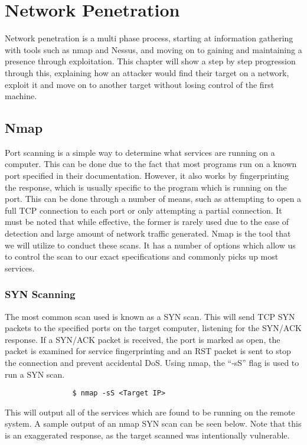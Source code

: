 \chapter{Network Penetration}
	\label{ch:NetworkPenetration}
	Network penetration is a multi phase process, starting at information gathering with tools such as nmap and Nessus, and moving on to gaining and maintaining a presence through exploitation.
	This chapter will show a step by step progression through this, explaining how an attacker would find their target on a network, exploit it and move on to another target without losing control of the first machine.
	\section{Nmap}
		Port scanning is a simple way to determine what services are running on a computer.
		This can be done due to the fact that most programs run on a known port specified in their documentation.
		However, it also works by fingerprinting the response, which is usually specific to the program which is running on the port.
		This can be done through a number of means, such as attempting to open a full TCP connection to each port or only attempting a partial connection.
		It must be noted that while effective, the former is rarely used due to the ease of detection and large amount of network traffic generated.
		Nmap\cite{NmapBook} is the tool that we will utilize to conduct these scans.
		It has a number of options which allow us to control the scan to our exact specifications and commonly picks up most services.\cite{HackingAOE}
		\subsection{SYN Scanning}
			The most common scan used is known as a SYN scan.
			This will send TCP SYN packets to the specified ports on the target computer, listening for the SYN/ACK response.
			If a SYN/ACK packet is received, the port is marked as open, the packet is examined for service fingerprinting and an RST packet is sent to stop the connection and prevent accidental DoS.
			Using nmap, the ``-sS'' flag is used to run a SYN scan.
			\begin{verbatim}
				$ nmap -sS <Target IP>
			\end{verbatim}
			This will output all of the services which are found to be running on the remote system.
			A sample output of an nmap SYN scan can be seen below.
			Note that this is an exaggerated response, as the target scanned was intentionally vulnerable.

